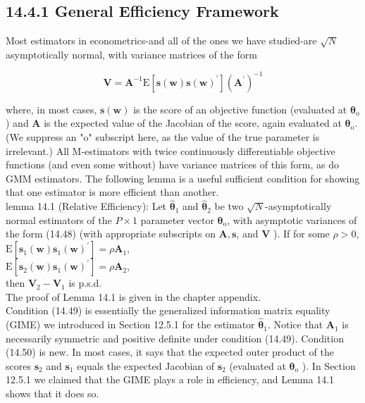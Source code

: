 \documentclass[10pt]{article}
\begin{document}
\subsection*{14.4.1 General Efficiency Framework}
Most estimators in econometrics-and all of the ones we have studied-are $\sqrt{N}$ asymptotically normal, with variance matrices of the form


\begin{equation*}
\mathbf{V}=\mathbf{A}^{-1} \mathrm{E}\left[\mathbf{s}(\mathbf{w}) \mathbf{s}(\mathbf{w})^{\prime}\right]\left(\mathbf{A}^{\prime}\right)^{-1} \tag{14.48}
\end{equation*}


where, in most cases, $\mathbf{s}(\mathbf{w})$ is the score of an objective function (evaluated at $\boldsymbol{\theta}_{\mathrm{o}}$ ) and $\mathbf{A}$ is the expected value of the Jacobian of the score, again evaluated at $\boldsymbol{\theta}_{\mathrm{o}}$. (We suppress an "o" subscript here, as the value of the true parameter is irrelevant.) All M-estimators with twice continuously differentiable objective functions (and even some without) have variance matrices of this form, as do GMM estimators. The following lemma is a useful sufficient condition for showing that one estimator is more efficient than another.\\
lemma 14.1 (Relative Efficiency): Let $\hat{\boldsymbol{\theta}}_{1}$ and $\hat{\boldsymbol{\theta}}_{2}$ be two $\sqrt{N}$-asymptotically normal estimators of the $P \times 1$ parameter vector $\boldsymbol{\theta}_{\mathrm{o}}$, with asymptotic variances of the form (14.48) (with appropriate subscripts on $\mathbf{A}, \mathbf{s}$, and $\mathbf{V}$ ). If for some $\rho>0$,\\
$\mathrm{E}\left[\mathbf{s}_{1}(\mathbf{w}) \mathbf{s}_{1}(\mathbf{w})^{\prime}\right]=\rho \mathbf{A}_{1}$,\\
$\mathrm{E}\left[\mathbf{s}_{2}(\mathbf{w}) \mathbf{s}_{1}(\mathbf{w})^{\prime}\right]=\rho \mathbf{A}_{2}$,\\
then $\mathbf{V}_{2}-\mathbf{V}_{1}$ is p.s.d.\\
The proof of Lemma 14.1 is given in the chapter appendix.\\
Condition (14.49) is essentially the generalized information matrix equality (GIME) we introduced in Section 12.5.1 for the estimator $\hat{\boldsymbol{\theta}}_{1}$. Notice that $\mathbf{A}_{1}$ is necessarily symmetric and positive definite under condition (14.49). Condition (14.50) is new. In most cases, it says that the expected outer product of the scores $\mathbf{s}_{2}$ and $\mathbf{s}_{1}$ equals the expected Jacobian of $\mathbf{s}_{2}$ (evaluated at $\boldsymbol{\theta}_{\mathrm{o}}$ ). In Section 12.5.1 we claimed that the GIME plays a role in efficiency, and Lemma 14.1 shows that it does so.
\end{document}
